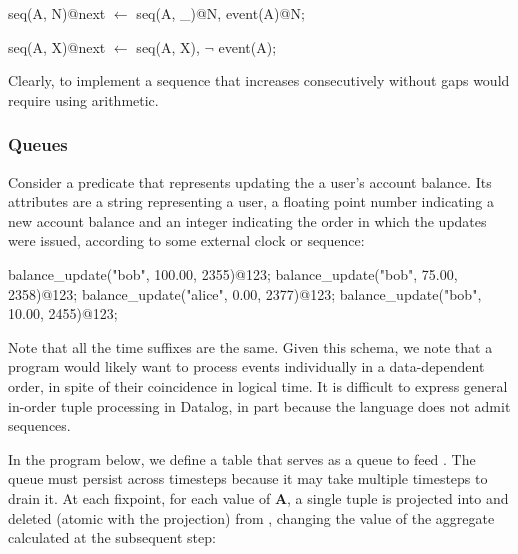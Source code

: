 \begin{Dedalus}
seq(A, N)@next \(\leftarrow\) seq(A, _)@N, event(A)@N;
  
seq(A, X)@next \(\leftarrow\) seq(A, X), \(\lnot\) event(A);
\end{Dedalus}


Clearly, to implement a sequence that increases consecutively without gaps would require using arithmetic.


\subsubsection{Queues}

Consider a predicate  that represents updating the a
user's account balance.  Its attributes are a string representing a user, a
floating point number indicating a new account balance and an integer
indicating the order in which the updates were issued, according to some
external clock or sequence:

\begin{Dedalus}
balance\_update("bob", 100.00, 2355)@123;
balance\_update("bob", 75.00, 2358)@123;
balance\_update("alice", 0.00, 2377)@123;
balance\_update("bob", 10.00, 2455)@123;
\end{Dedalus}

Note that all the time suffixes are the same.  
Given this schema, we note that a program would likely want to process
 events individually in a data-dependent order, in
spite of their coincidence in logical time.  It is difficult to express general
in-order tuple processing in Datalog, in part because the language does not
admit sequences.

In the program below, we define a table  that
serves as a queue to feed .  The queue must persist
across timesteps because it may take multiple timesteps to drain it.  At each
fixpoint, for each value of \textbf{A}, a single tuple is projected into
 and deleted (atomic with the projection) from
, changing the value of the aggregate calculated
at the subsequent step:

